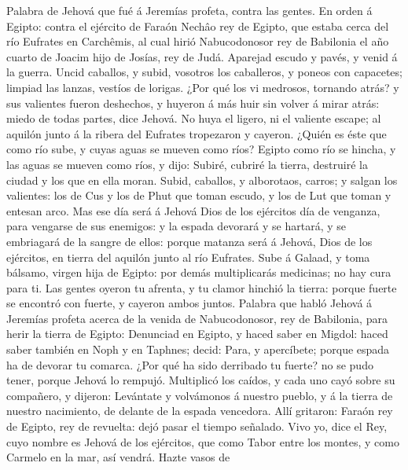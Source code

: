  Palabra de Jehová que fué á Jeremías profeta, contra las
gentes.  En orden á Egipto: contra el ejército de Faraón
Nechâo rey de Egipto, que estaba cerca del río Eufrates en Carchêmis, al
cual hirió Nabucodonosor rey de Babilonia el año cuarto de Joacim hijo
de Josías, rey de Judá.  Aparejad escudo y pavés, y venid
á la guerra.  Uncid caballos, y subid, vosotros los
caballeros, y poneos con capacetes; limpiad las lanzas, vestíos de
lorigas.  ¿Por qué los vi medrosos, tornando atrás? y sus
valientes fueron deshechos, y huyeron á más huir sin volver á mirar
atrás: miedo de todas partes, dice Jehová.  No huya el
ligero, ni el valiente escape; al aquilón junto á la ribera del Eufrates
tropezaron y cayeron.  ¿Quién es éste que como río sube, y
cuyas aguas se mueven como ríos?  Egipto como río se
hincha, y las aguas se mueven como ríos, y dijo: Subiré, cubriré la
tierra, destruiré la ciudad y los que en ella moran. 
Subid, caballos, y alborotaos, carros; y salgan los valientes: los de
Cus y los de Phut que toman escudo, y los de Lut que toman y entesan
arco.  Mas ese día será á Jehová Dios de los ejércitos
día de venganza, para vengarse de sus enemigos: y la espada devorará y
se hartará, y se embriagará de la sangre de ellos: porque matanza será á
Jehová, Dios de los ejércitos, en tierra del aquilón junto al río
Eufrates.  Sube á Galaad, y toma bálsamo, virgen hija de
Egipto: por demás multiplicarás medicinas; no hay cura para ti.
 Las gentes oyeron tu afrenta, y tu clamor hinchió la
tierra: porque fuerte se encontró con fuerte, y cayeron ambos juntos.
 Palabra que habló Jehová á Jeremías profeta acerca de la
venida de Nabucodonosor, rey de Babilonia, para herir la tierra de
Egipto:  Denunciad en Egipto, y haced saber en Migdol:
haced saber también en Noph y en Taphnes; decid: Para, y apercíbete;
porque espada ha de devorar tu comarca.  ¿Por qué ha sido
derribado tu fuerte? no se pudo tener, porque Jehová lo rempujó.
 Multiplicó los caídos, y cada uno cayó sobre su
compañero, y dijeron: Levántate y volvámonos á nuestro pueblo, y á la
tierra de nuestro nacimiento, de delante de la espada vencedora.
 Allí gritaron: Faraón rey de Egipto, rey de revuelta:
dejó pasar el tiempo señalado.  Vivo yo, dice el Rey,
cuyo nombre es Jehová de los ejércitos, que como Tabor entre los montes,
y como Carmelo en la mar, así vendrá.  Hazte vasos de
